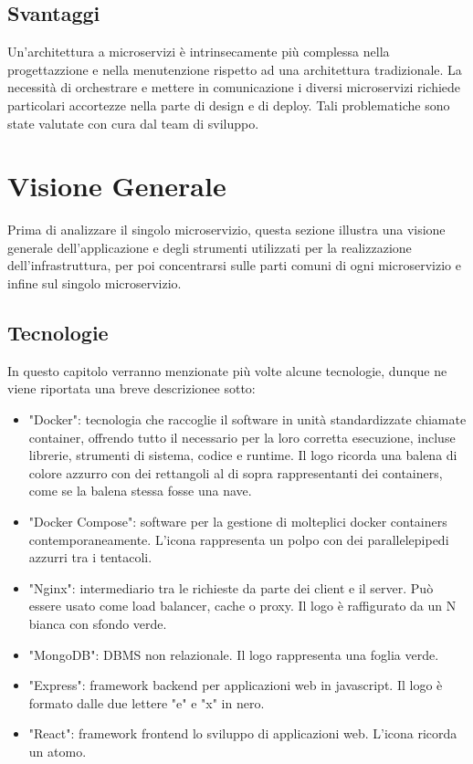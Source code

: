 \documentclass{report}
\begin{document}
\subsection*{Svantaggi}

Un'architettura a microservizi è intrinsecamente più complessa nella progettazzione e nella menutenzione rispetto ad una architettura tradizionale. La necessità di orchestrare e mettere in comunicazione i diversi microservizi richiede particolari accortezze nella parte di design e di deploy. Tali problematiche sono state valutate con cura dal team di sviluppo.



\section{Visione Generale}
Prima di analizzare il singolo microservizio, questa sezione illustra una visione generale dell'applicazione e degli strumenti utilizzati per la realizzazione dell'infrastruttura, per poi concentrarsi sulle parti comuni di ogni microservizio e infine sul singolo microservizio.

\subsection{Tecnologie}

In questo capitolo verranno menzionate più volte alcune tecnologie, dunque ne viene riportata una breve descrizionee sotto:
\begin{itemize}
	\item "Docker": tecnologia che raccoglie il software in unità standardizzate chiamate container, offrendo tutto il necessario per la loro corretta esecuzione, incluse librerie, strumenti di sistema, codice e runtime. Il logo ricorda una balena di colore azzurro con dei rettangoli al di sopra rappresentanti dei containers, come se la balena stessa fosse una nave.
	\item "Docker Compose": software per la gestione di molteplici docker containers contemporaneamente. L'icona rappresenta un polpo con dei parallelepipedi azzurri tra i tentacoli.
	\item "Nginx": intermediario tra le richieste da parte dei client e il server. Può essere usato come load balancer, cache o proxy. Il logo è raffigurato da un N bianca con sfondo verde.
	\item "MongoDB": DBMS non relazionale. Il logo rappresenta una foglia verde.
	\item "Express": framework backend per applicazioni web in javascript. Il logo è formato dalle due lettere "e" e "x" in nero.
	\item "React": framework frontend lo sviluppo di applicazioni web. L'icona ricorda un atomo.
\end{itemize}
\end{document}
